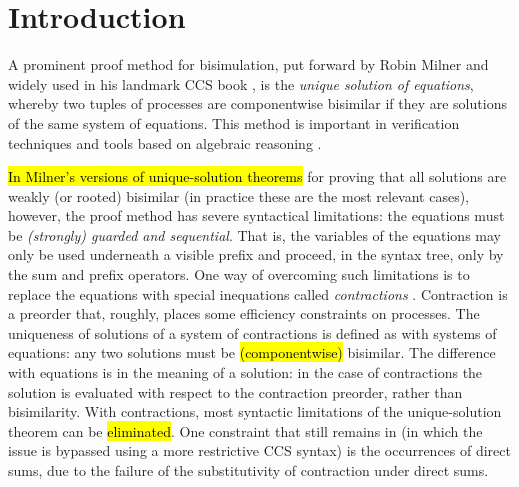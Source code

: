\section{Introduction}

A prominent proof method for bisimulation, put forward by Robin Milner and widely used in his
landmark CCS book \cite{Mil89}, is the
\emph{unique solution of equations}, whereby two tuples of processes are
componentwise bisimilar if they are solutions 
of the same system of equations.
This method is important in verification techniques and tools
based on algebraic reasoning \cite{BaeBOOK,theoryAndPractice,RosUnder10}. 

\hl{In Milner's versions of unique-solution theorems} for proving that all
solutions are weakly (or rooted) bisimilar (in practice these are the most
relevant cases), however, the proof method has severe syntactical limitations:
the equations must be \emph{(strongly) guarded and sequential}. That is, the
variables of the equations may only be used underneath a visible
prefix and proceed, in the syntax tree, only by the sum and prefix operators.
One way of overcoming such limitations is to replace the equations
 with special inequations called
\emph{contractions} \cite{sangiorgi2015equations,sangiorgi2017equations}. Contraction is a
preorder that, roughly, places some efficiency
constraints on processes.  The uniqueness of solutions of a system of contractions
is defined as with systems of equations: any two solutions must be \hl{(componentwise)} bisimilar.
The difference with equations is in the meaning of a solution:
in the case of contractions the solution is evaluated with respect to
the contraction preorder, rather than bisimilarity. 
With contractions, most syntactic limitations of the unique-solution theorem can be
\hl{eliminated}.  One constraint that still remains in
\cite{sangiorgi2017equations} (in which the issue is bypassed using a more
restrictive CCS syntax)
is the occurrences of direct sums, due to the failure of the
substitutivity of contraction under direct sums.

